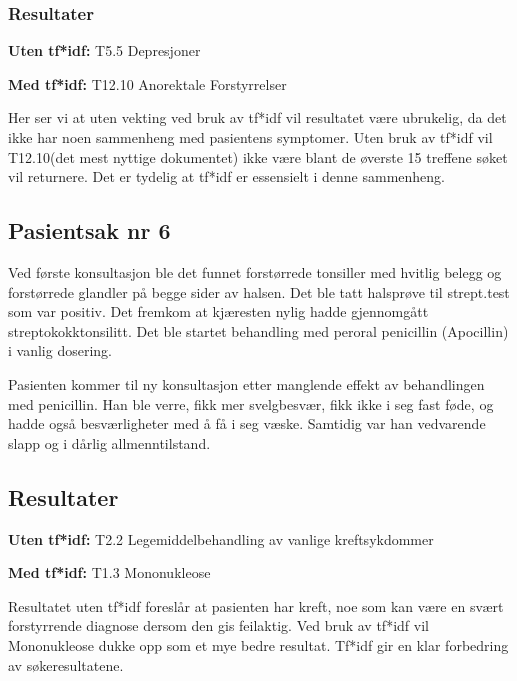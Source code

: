 \subsubsection{Resultater}
\begin{description}
\item{\textbf{Uten tf*idf: }}T5.5 Depresjoner
\item{\textbf{Med tf*idf: }}T12.10 Anorektale Forstyrrelser
\end{description}

Her ser vi at uten vekting ved bruk av tf*idf vil resultatet være ubrukelig, da det ikke har noen sammenheng med pasientens symptomer. Uten bruk av tf*idf vil T12.10(det mest nyttige dokumentet) ikke være blant de øverste 15 treffene søket vil returnere. Det er tydelig at tf*idf er essensielt i denne sammenheng.


\subsection{Pasientsak nr 6}
Ved første konsultasjon ble det funnet forstørrede tonsiller med hvitlig belegg og forstørrede glandler på begge sider av halsen. Det ble tatt halsprøve til strept.test som var positiv. Det fremkom at kjæresten nylig hadde gjennomgått streptokokktonsilitt. Det ble startet behandling med peroral penicillin (Apocillin) i vanlig dosering.

Pasienten kommer til ny konsultasjon etter manglende effekt av behandlingen med penicillin. Han ble verre, fikk mer svelgbesvær, fikk ikke i seg fast føde, og hadde også besværligheter med å få i seg væske. Samtidig var han vedvarende slapp og i dårlig allmenntilstand.

\subsection{Resultater}
\begin{description}
\item{\textbf{Uten tf*idf: }} T2.2 Legemiddelbehandling av vanlige kreftsykdommer
\item{\textbf{Med tf*idf: }} T1.3 Mononukleose
\end{description}
Resultatet uten tf*idf foreslår at pasienten har kreft, noe som kan være en svært forstyrrende diagnose dersom den gis feilaktig. Ved bruk av tf*idf vil Mononukleose dukke opp som et mye bedre resultat. Tf*idf gir en klar forbedring av søkeresultatene. 
